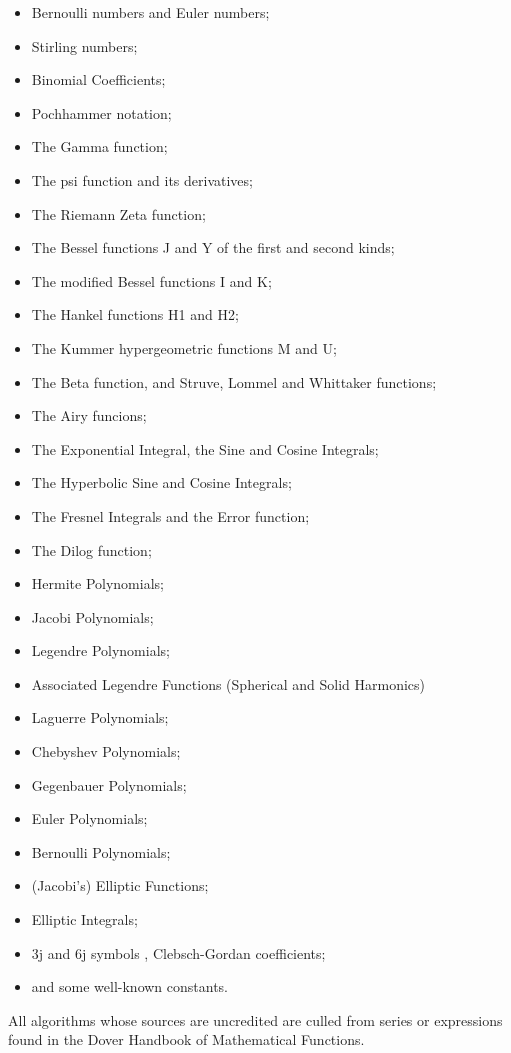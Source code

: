 \begin{itemize}
\item Bernoulli numbers and Euler numbers;
\item Stirling numbers;
\item Binomial Coefficients;
\item Pochhammer notation;
\item The Gamma function;
\item The psi function and its derivatives;
\item The Riemann Zeta function;
\item The Bessel functions J and Y of the first and second kinds;
\item The modified Bessel functions I and K;
\item The Hankel functions H1 and H2;
\item The Kummer hypergeometric functions M and U;
\item The Beta function, and Struve, Lommel and Whittaker functions;
\item The Airy funcions;
\item The Exponential Integral, the Sine and Cosine Integrals;
\item The Hyperbolic Sine and Cosine Integrals;
\item The Fresnel Integrals and the Error function;
\item The Dilog function;
\item Hermite Polynomials;
\item Jacobi Polynomials;
\item Legendre Polynomials;
\item Associated Legendre Functions (Spherical and Solid Harmonics)
\item Laguerre Polynomials;
\item Chebyshev Polynomials;
\item Gegenbauer Polynomials;
\item Euler Polynomials;
\item Bernoulli Polynomials;
\item (Jacobi's) Elliptic Functions;
\item Elliptic Integrals;
\item 3j and 6j symbols , Clebsch-Gordan coefficients;
\item and some well-known constants.
\end{itemize}

All algorithms whose sources are uncredited are culled from series or
expressions found in the Dover Handbook of Mathematical
Functions\cite{Abramowitz:72}.

